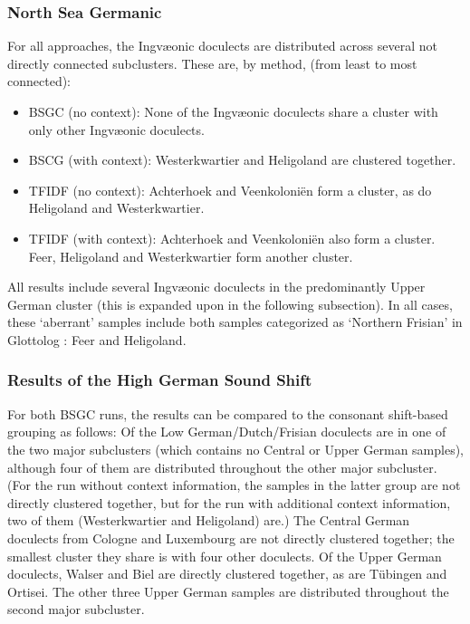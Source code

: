 \documentclass[a4paper]{article}
\begin{document}

\subsubsection{North Sea Germanic}

For all approaches, the Ingv\ae{}onic doculects
are distributed across several not directly connected subclusters.
These are, by method, (from least to most connected):

\begin{itemize}
\item
BSGC (no context):
None of the Ingv\ae{}onic doculects share a cluster
with only other Ingv\ae{}onic doculects.

\item
BSCG (with context):
Westerkwartier and Heligoland are clustered together.

\item
TFIDF (no context):
Achterhoek and Veenkoloni\"{e}n form a cluster,
as do Heligoland and Westerkwartier.

\item
TFIDF (with context):
Achterhoek and Veenkoloni\"{e}n also form a cluster.
Feer, Heligoland and Westerkwartier form another cluster.
\end{itemize}

All results include several Ingv\ae{}onic doculects
in the predominantly Upper German cluster
(this is expanded upon in the following subsection).
In all cases, these `aberrant' %
samples include both samples categorized as `Northern Frisian'
in Glottolog \citep{hammarstroem2018glottolog}: Feer and Heligoland.


\subsubsection{Results of the High German Sound Shift}

For both BSGC runs, the results can be compared to the consonant shift-based grouping as follows:
Of the Low German/Dutch/Frisian doculects are in
one of the two major subclusters %
(which contains no Central or Upper German samples),
although four of them are distributed throughout the other major subcluster.
(For the run without context information,
the samples in the latter group are not directly clustered together,
but for the run with additional context information,
two of them (Westerkwartier and Heligoland) are.)
The Central German doculects from Cologne and Luxembourg
are not directly clustered together; the smallest cluster they share
is with four other doculects.
Of the Upper German doculects,
Walser and Biel are directly clustered together,
as are T\"{u}bingen and Ortisei.
The other three Upper German samples are distributed throughout
the second major subcluster.
\end{document}
